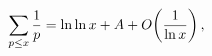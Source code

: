 \[\sum_{p\leq x}\frac{1}{p}=\mathop{\ln\/}\nolimits\mathop{\ln\/}\nolimits x+A+%
\mathop{O\/}\nolimits\!\left(\frac{1}{\mathop{\ln\/}\nolimits x}\right),\]